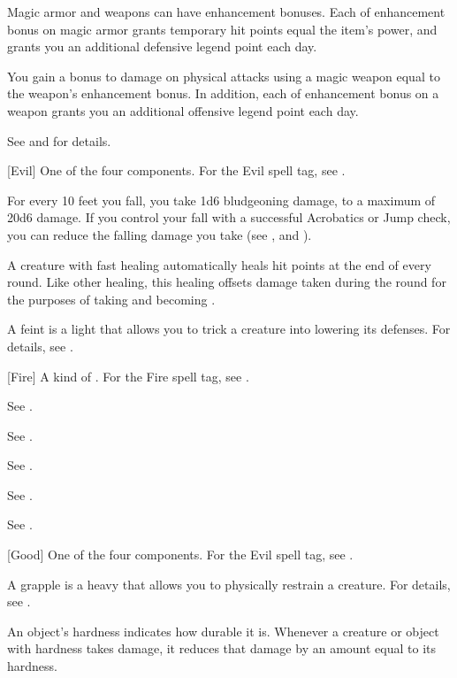  Magic armor and weapons can have enhancement bonuses.
Each  of enhancement bonus on magic armor grants temporary hit points equal the item's power, and grants you an additional defensive legend point each day.

You gain a bonus to damage on physical attacks using a magic weapon equal to the weapon's enhancement bonus.
In addition, each  of enhancement bonus on a weapon grants you an additional offensive legend point each day.

See  and  for details.

[Evil] One of the four  components. For the Evil spell tag, see .

 For every 10 feet you fall, you take 1d6 bludgeoning damage, to a maximum of 20d6 damage.
If you control your fall with a successful Acrobatics or Jump check, you can reduce the falling damage you take (see , and ).

 A creature with fast healing automatically heals hit points at the end of every round.
Like other healing, this healing offsets damage taken during the round for the purposes of taking  and becoming \disabled.

 A feint is a light  that allows you to trick a creature into lowering its defenses.
For details, see .

[Fire] A kind of . For the Fire spell tag, see .

 See .

 See .

 See .

 See .

 See .

[Good] One of the four  components. For the Evil spell tag, see .

 A grapple is a heavy  that allows you to physically restrain a creature.
For details, see .

 An object's hardness indicates how durable it is.
Whenever a creature or object with hardness takes damage, it reduces that damage by an amount equal to its hardness.

